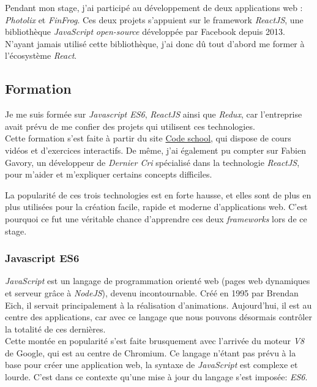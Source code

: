 \bigskip

Pendant mon stage, j'ai participé au développement de deux applications
web : \emph{Photolix} et \emph{FinFrog}. Ces deux projets s'appuient sur
le framework \emph{ReactJS}, une bibliothèque \emph{JavaScript}
\emph{open-source} développée par Facebook depuis 2013. N'ayant jamais
utilisé cette bibliothèque, j'ai donc dû tout d'abord me former à
l'écosystème \emph{React}.

\bigskip

\subsection{Formation}\label{formation}

\bigskip

Je me suis formée sur \emph{Javascript ES6}, \emph{ReactJS} ainsi que
\emph{Redux}, car l'entreprise avait prévu de me confier des projets qui
utilisent ces technologies.\\
Cette formation s'est faite à partir du site
\href{https://www.codeschool.com/}{Code school}, qui dispose de cours
vidéos et d'exercices interactifs. De même, j'ai également pu compter
sur Fabien Gavory, un développeur de \emph{Dernier Cri} spécialisé dans
la technologie \emph{ReactJS}, pour m'aider et m'expliquer certains
concepts difficiles.

\bigskip

La popularité de ces trois technologies est en forte hausse, et elles
sont de plus en plus utilisées pour la création facile, rapide et
moderne d'applications web. C'est pourquoi ce fut une véritable chance
d'apprendre ces deux \emph{frameworks} lors de ce stage.

\bigskip

\subsubsection{Javascript ES6}\label{javascript-es6}

\bigskip

\emph{JavaScript} est un langage de programmation orienté web (pages web
dynamiques et serveur grâce à \emph{NodeJS}), devenu incontournable.
Créé en 1995 par Brendan Eich, il servait principalement à la
réalisation d'animations. Aujourd'hui, il est au centre des
applications, car avec ce langage que nous pouvons désormais contrôler
la totalité de ces dernières.\\
Cette montée en popularité s'est faite brusquement avec l'arrivée du
moteur \emph{V8} de Google, qui est au centre de Chromium. Ce langage
n'étant pas prévu à la base pour créer une application web, la syntaxe
de \emph{JavaScript} est complexe et lourde. C'est dans ce contexte
qu'une mise à jour du langage s'est imposée: \emph{ES6}.

